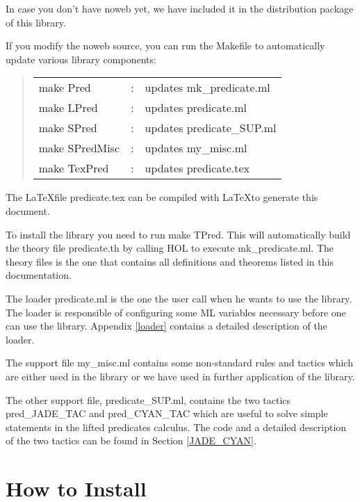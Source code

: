 In case you don't have \code{}noweb\edoc{} yet, we have included it in the
distribution package of this library.

If you modify the \code{}noweb\edoc{} source, you can run the \code{}Makefile\edoc{} to
automatically update various library components:

\begin{quote}
\begin{tabular}{lcl}
    \code{}make Pred\edoc{} & : & updates \code{}mk_predicate.ml\edoc{} \\
    \code{}make LPred\edoc{} & : & updates \code{}predicate.ml\edoc{} \\
    \code{}make SPred\edoc{} & : & updates \code{}predicate_SUP.ml\edoc{} \\
    \code{}make SPredMisc\edoc{} & : & updates \code{}my_misc.ml\edoc{} \\
    \code{}make TexPred\edoc{} & : & updates \code{}predicate.tex\edoc{}
\end{tabular}
\end{quote}

The \LaTeX file \code{}predicate.tex\edoc{} can be compiled with \LaTeX to
generate this document. 

To install the library you need to run \code{}make TPred\edoc{}. This will
automatically build the theory file \code{}predicate.th\edoc{} by calling HOL to
execute \code{}mk_predicate.ml\edoc{}. The theory files is the one that contains
all definitions and theorems listed in this documentation.

The loader \code{}predicate.ml\edoc{} is the one the user call when he wants to use
the library. The loader is responsible of configuring some ML
variables necessary before one can use the library. Appendix
\ref{loader} contains a detailed description of the loader.

The support file \code{}my_misc.ml\edoc{} contains some non-standard rules and
tactics which are either used in the library or we have used in
further application of the library. 

The other support file, \code{}predicate_SUP.ml\edoc{}, contains the two tactics
\code{}pred_JADE_TAC\edoc{} and \code{}pred_CYAN_TAC\edoc{} which are useful to solve
simple statements in the lifted predicates calculus. The code and a
detailed description of the two tactics can be found in Section
\ref{JADE_CYAN}.

\section{How to Install}

